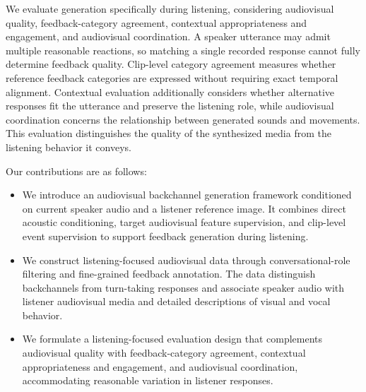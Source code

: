 We evaluate generation specifically during listening,
considering audiovisual quality, feedback-category agreement,
contextual appropriateness and engagement, and audiovisual
coordination. A speaker utterance may admit multiple
reasonable reactions, so matching a single recorded response
cannot fully determine feedback quality. Clip-level category
agreement measures whether reference feedback categories are
expressed without requiring exact temporal alignment.
Contextual evaluation additionally considers whether
alternative responses fit the utterance and preserve the
listening role, while audiovisual coordination concerns the
relationship between generated sounds and movements. This
evaluation distinguishes the quality of the synthesized
media from the listening behavior it conveys.

Our contributions are as follows:
\begin{itemize}
    \item We introduce an audiovisual backchannel generation
    framework conditioned on current speaker audio and a
    listener reference image. It combines direct acoustic
    conditioning, target audiovisual feature supervision,
    and clip-level event supervision to support feedback
    generation during listening.

    \item We construct listening-focused audiovisual data
    through conversational-role filtering and fine-grained
    feedback annotation. The data distinguish backchannels
    from turn-taking responses and associate speaker audio
    with listener audiovisual media and detailed descriptions
    of visual and vocal behavior.

    \item We formulate a listening-focused evaluation design
    that complements audiovisual quality with feedback-category
    agreement, contextual appropriateness and engagement,
    and audiovisual coordination, accommodating reasonable
    variation in listener responses.
\end{itemize}


